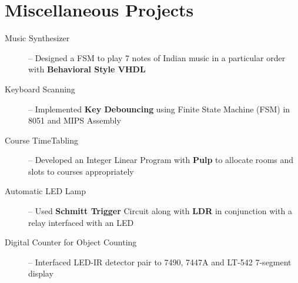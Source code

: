 \documentclass[10pt,a4paper,sans]{moderncv}        %
\begin{document}
\section{Miscellaneous Projects}
\vspace{0.2em}
\begin{description}
	\item[Music Synthesizer] -- Designed a FSM to play 7 notes of Indian music in a particular order with \textbf{Behavioral Style VHDL}%
	\item[Keyboard Scanning] -- Implemented \textbf{Key Debouncing} using Finite State Machine (FSM) in 8051 and MIPS Assembly
	\item[Course TimeTabling] -- Developed an Integer Linear Program with \textbf{Pulp} to allocate rooms and slots to courses appropriately%
	\item[Automatic LED Lamp] -- Used \textbf{Schmitt Trigger} Circuit along with \textbf{LDR} in conjunction with a relay interfaced with an LED
	\item[Digital Counter for Object Counting] -- Interfaced LED-IR detector pair to 7490, 7447A and LT-542 7-segment display%
\end{description}
\end{document}
